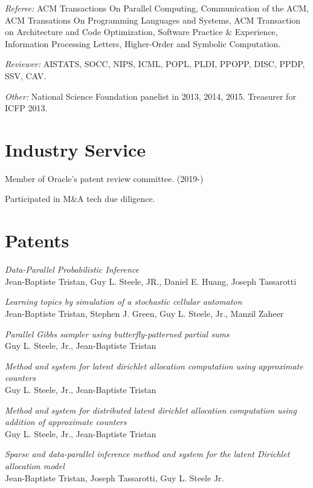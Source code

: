 \documentclass[margin,line]{res}
\begin{document}
\begin{resume}
{\em Referee:} ACM Transactions On Parallel Computing, Communication of the ACM, ACM Transations On Programming Languages and Systems, ACM Transaction on Architecture and Code Optimization, 
Software Practice \& Experience, Information Processing Letters, Higher-Order and Symbolic Computation.

{\em Reviewer:} AISTATS, SOCC, NIPS, ICML, POPL, PLDI, PPOPP, DISC, PPDP, SSV,
CAV.

{\em Other:} National Science Foundation panelist in 2013, 2014, 2015. Treasurer for ICFP 2013.

\section{\sc Industry Service}

Member of Oracle's patent review committee. (2019-)

Participated in M\&A tech due diligence.

\section{\sc Patents}

\emph{Data-Parallel Probabilistic Inference}\\
Jean-Baptiste Tristan, Guy L. Steele, JR., Daniel E. Huang, Joseph Tassarotti

\emph{Learning topics by simulation of a stochastic cellular automaton}\\
Jean-Baptiste Tristan, Stephen J. Green, Guy L. Steele, Jr., Manzil Zaheer

\emph{Parallel Gibbs sampler using butterfly-patterned partial sums}\\
Guy L. Steele, Jr., Jean-Baptiste Tristan

\emph{Method and system for latent dirichlet allocation computation using approximate counters}\\
Guy L. Steele, Jr., Jean-Baptiste Tristan

\emph{Method and system for distributed latent dirichlet allocation computation using addition of approximate counters}\\
Guy L. Steele, Jr., Jean-Baptiste Tristan

\emph{Sparse and data-parallel inference method and system for the latent Dirichlet allocation model}\\
Jean-Baptiste Tristan, Joseph Tassarotti, Guy L. Steele Jr.




\end{resume}
\end{document}
